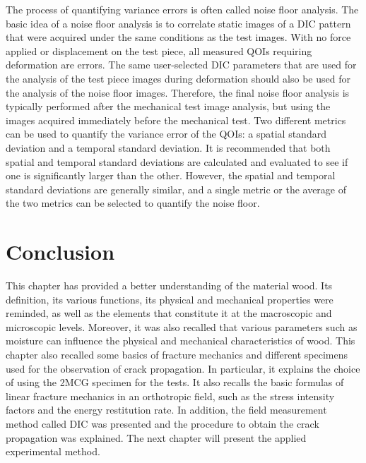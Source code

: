 The process of quantifying variance errors is often called noise floor analysis. The basic idea of a noise floor analysis is to correlate static images of a DIC pattern that were acquired under the same conditions as the test images. With no force applied or displacement on the test piece, all measured QOIs requiring deformation are errors. The same user-selected DIC parameters that are used for the analysis of the test piece images during deformation should also be used for the analysis of the noise floor images. Therefore, the final noise floor analysis is typically performed after the mechanical test image analysis, but using the images acquired immediately before the mechanical test.
Two different metrics can be used to quantify the variance error of the QOIs: a spatial standard deviation and a temporal standard deviation. It is recommended that both spatial and temporal standard deviations are calculated and evaluated to see if one is significantly larger than the other. However, the spatial and temporal standard deviations are generally similar, and a single metric or the average of the two metrics can be selected to quantify the noise floor. 


\section{Conclusion}

This chapter has provided a better understanding of the material wood. Its definition, its various functions, its physical and mechanical properties were reminded, as well as the elements that constitute it at the macroscopic and microscopic levels. Moreover, it was also recalled that various parameters such as moisture can influence the physical and mechanical characteristics of wood.
This chapter also recalled some basics of fracture mechanics and different specimens used for the observation of crack propagation. In particular, it explains the choice of using the 2MCG specimen for the tests. It also recalls the basic formulas of linear fracture mechanics in an orthotropic field, such as the stress intensity factors and the energy restitution rate. In addition, the field measurement method called DIC was presented and the procedure to obtain the crack propagation was explained. The next chapter will present the applied experimental method.


